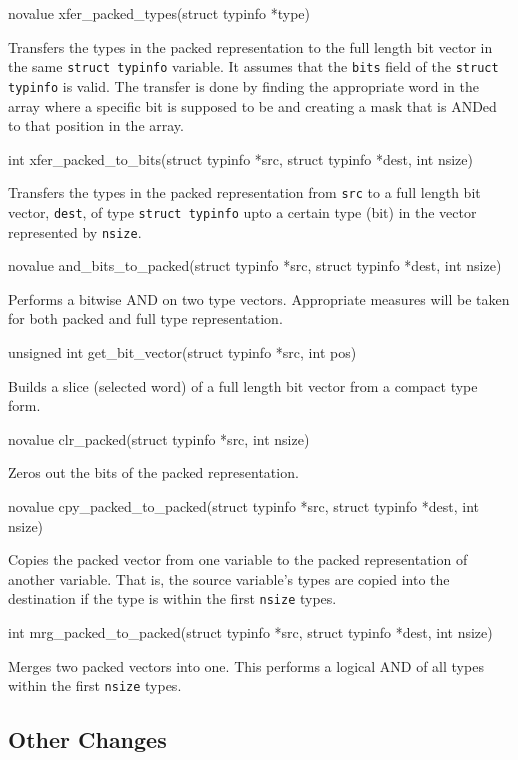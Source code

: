 {\ttfamily\mdseries
novalue xfer\_packed\_types(struct typinfo *type)}

Transfers the types in the packed representation to the full length
bit vector in the same \texttt{struct typinfo} variable. It assumes
that the \texttt{bits} field of the \texttt{struct typinfo} is
valid. The transfer is done by finding the appropriate word in the
array where a specific bit is supposed to be and creating a mask that
is ANDed to that position in the array.

{\ttfamily\mdseries
int xfer\_packed\_to\_bits(struct typinfo *src, struct typinfo *dest, int nsize)}

Transfers the types in the packed representation from \texttt{src} to
a full length bit vector, \texttt{dest}, of type \texttt{struct
typinfo} upto a certain type (bit) in the vector represented by
\texttt{nsize}.

{\ttfamily\mdseries
novalue and\_bits\_to\_packed(struct typinfo *src, struct typinfo *dest, int nsize)}

Performs a bitwise AND on two type vectors. Appropriate measures
will be taken for both packed and full type representation.

{\ttfamily\mdseries
unsigned int get\_bit\_vector(struct typinfo *src, int pos)}

Builds a slice (selected word) of a full length bit vector from a
compact type form.

{\ttfamily\mdseries
novalue clr\_packed(struct typinfo *src, int nsize)}

Zeros out the bits of the packed representation.

{\ttfamily\mdseries
novalue cpy\_packed\_to\_packed(struct typinfo *src, struct typinfo *dest, int nsize)}

Copies the packed vector from one variable to the packed
representation of another variable. That is, the source variable's
types are copied into the destination if the type is within the first
\texttt{nsize} types.

{\ttfamily\mdseries
int mrg\_packed\_to\_packed(struct typinfo *src, struct typinfo *dest, int nsize)}

Merges two packed vectors into one. This performs a logical AND of
all types within the first \texttt{nsize} types.

\subsection{Other Changes}

